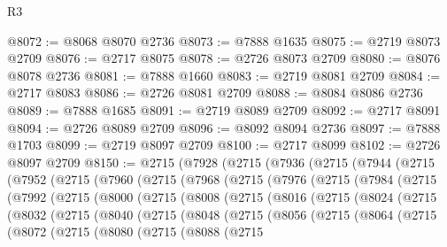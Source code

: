 \begin{lexlean}{R3}
\begin{coremodule}
@8072 := @8068 @8070 @2736
@8073 := @7888 @1635
@8075 := @2719 @8073 @2709
@8076 := @2717 @8075
@8078 := @2726 @8073 @2709
@8080 := @8076 @8078 @2736
@8081 := @7888 @1660
@8083 := @2719 @8081 @2709
@8084 := @2717 @8083
@8086 := @2726 @8081 @2709
@8088 := @8084 @8086 @2736
@8089 := @7888 @1685
@8091 := @2719 @8089 @2709
@8092 := @2717 @8091
@8094 := @2726 @8089 @2709
@8096 := @8092 @8094 @2736
@8097 := @7888 @1703
@8099 := @2719 @8097 @2709
@8100 := @2717 @8099
@8102 := @2726 @8097 @2709
@8150 := @2715
    (@7928
      (@2715
        (@7936
          (@2715
            (@7944
              (@2715
                (@7952
                  (@2715
                    (@7960
                      (@2715
                        (@7968
                          (@2715
                            (@7976
                              (@2715
                                (@7984
                                  (@2715
                                    (@7992
                                      (@2715
                                        (@8000
                                          (@2715
                                            (@8008
                                              (@2715
                                                (@8016
                                                  (@2715
                                                    (@8024
                                                      (@2715
                                                        (@8032
                                                          (@2715
                                                            (@8040
                                                              (@2715
                                                                (@8048
                                                                  (@2715
                                                                    (@8056
                                                                      (@2715
                                                                        (@8064
                                                                          (@2715
                                                                            (@8072
                                                                              (@2715
                                                                                (@8080
                                                                                  (@2715
                                                                                    (@8088
                                                                                      (@2715

\end{coremodule}
\end{lexlean}
